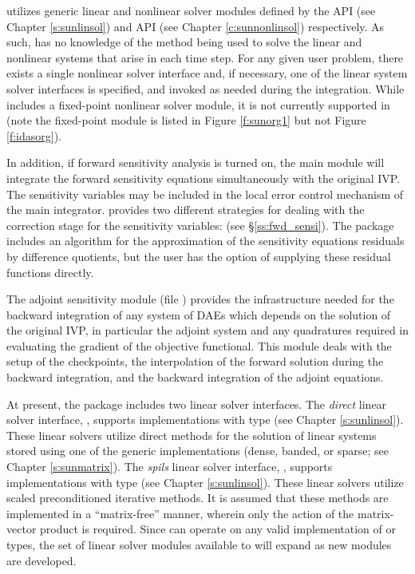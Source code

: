 {\idas} utilizes generic linear and nonlinear solver modules defined by the
{\sunlinsol} API (see Chapter \ref{s:sunlinsol}) and {\sunnonlinsol} API (see
Chapter \ref{c:sunnonlinsol}) respectively. As such, {\idas} has no knowledge
of the method being used to solve the linear and nonlinear systems that
arise in each time step. For any given user problem, there exists a single
nonlinear solver interface and, if necessary, one of the linear system solver
interfaces is specified, and invoked as needed during the integration. While
{\sundials} includes a fixed-point nonlinear solver module, it is not currently
supported in {\idas} (note the fixed-point module is listed in Figure
\ref{f:sunorg1} but not Figure \ref{f:idasorg}).

In addition, if forward sensitivity analysis is turned on, the main module 
will integrate the forward sensitivity equations simultaneously with the original
IVP. The sensitivity variables may be included in the local error control
mechanism of the main integrator.
{\idas} provides two different strategies for dealing with the correction
stage for the sensitivity variables:  
(see \S\ref{ss:fwd_sensi}).
The {\idas} package includes an algorithm for the approximation of the
sensitivity equations residuals by difference quotients, but the user has
the option of supplying these residual functions directly.

The adjoint sensitivity module (file ) provides the infrastructure needed for the 
backward integration of any system of DAEs which depends on the solution 
of the original IVP, in particular the adjoint system and any quadratures required
in evaluating the gradient of the objective functional.  This module deals with
the setup of the checkpoints, the interpolation of the forward solution during
the backward integration, and the backward integration of the adjoint equations.

At present, the package includes two linear solver interfaces.  The
{\em direct} linear solver interface, {\idadls}, supports {\sunlinsol}
implementations with type  (see Chapter
\ref{s:sunlinsol}).  These linear solvers utilize direct methods for
the solution of linear systems stored using one of the {\sundials} generic
{\sunmatrix} implementations (dense, banded, or sparse; see
Chapter \ref{s:sunmatrix}).  
The {\em spils} linear solver interface, {\idaspils}, supports
{\sunlinsol} implementations with type 
(see Chapter \ref{s:sunlinsol}).  These linear solvers utilize scaled
preconditioned iterative methods.  It is assumed that these methods
are implemented in a ``matrix-free'' manner, wherein only the action
of the matrix-vector product is required.  Since {\idas} can
operate on any valid {\sunlinsol} implementation of
 or  types, the set of
linear solver modules available to {\idas} will expand as new
{\sunlinsol} modules are developed.

